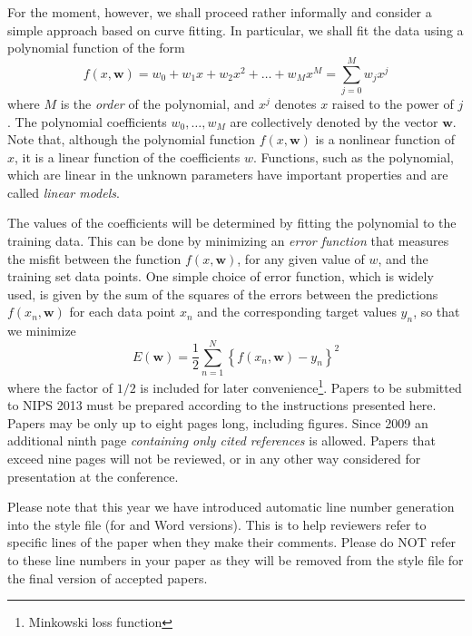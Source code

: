 \documentclass{article} %
\begin{document}
For the moment, however, we shall proceed rather informally and consider a simple approach based on curve fitting. In particular, we shall fit the data using a polynomial function of the form
%
\begin{equation}
      f(x, \mathbf{w})=w_{0}+w_{1} x+w_{2} x^{2}+\ldots+w_{M} x^{M}=\sum_{j=0}^{M} w_{j} x^{j}
      \label{eq:intro-poly}
\end{equation}
%
where $M$ is the \textit{order} of the polynomial, and $x^j$ denotes $x$ raised to the power of $j$. The polynomial coefficients $w_0, \dots , w_M$ are collectively denoted by the vector $\mathbf{w}$. Note that, although the polynomial function $f(x, \mathbf{w})$ is a nonlinear function of $x$, it is a linear function of the coefficients $w$. Functions, such as the polynomial, which are linear in the unknown parameters have important properties and are called \textit{linear models}.

The values of the coefficients will be determined by fitting the polynomial to the training data. This can be done by minimizing an \textit{error function} that measures the misfit between the function $f(x, \mathbf{w})$, for any given value of $w$, and the training set data points. One simple choice of error function, which is widely used, is given by the sum of the squares of the errors between the predictions $f(x_n, \mathbf{w})$ for each data point $x_n$ and the corresponding target values $y_n$, so that we minimize
%
\begin{equation}
      E(\mathbf{w})=\frac{1}{2} \sum_{n=1}^{N}\left\{f\left(x_{n}, \mathbf{w}\right)-y_{n}\right\}^{2}
\end{equation}
%
where the factor of $1/2$ is included for later convenience\footnote{Minkowski loss function}.
Papers to be submitted to NIPS 2013 must be prepared according to the
instructions presented here. Papers may be only up to eight pages long,
including figures. Since 2009 an additional ninth page \textit{containing only
   cited references} is allowed. Papers that exceed nine pages will not be
reviewed, or in any other way considered for presentation at the conference.

Please note that this year we have introduced automatic line number generation
into the style file (for \LaTeXe and Word versions). This is to help reviewers
refer to specific lines of the paper when they make their comments. Please do
NOT refer to these line numbers in your paper as they will be removed from the
style file for the final version of accepted papers.
\end{document}
